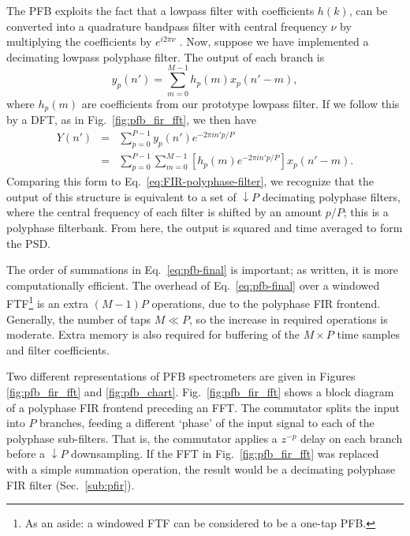 \documentclass{ws-rv961x669}
\begin{document}
The PFB exploits the fact that a lowpass filter with coefficients $h(k)$, can be converted into a quadrature bandpass filter with central frequency $\nu$ by multiplying the coefficients by $e^{i 2\pi \nu}$ . 
Now, suppose we have implemented a decimating lowpass polyphase filter. The output of each branch is 
\begin{equation}
y_{p}(n')=\sum_{m=0}^{M-1}h_{p}(m)x_{p}(n'-m),
\end{equation}
where $h_{p}(m)$ are coefficients from our prototype lowpass filter. If we follow this by a DFT, as in Fig.~\ref{fig:pfb_fir_fft}, we then have 
\begin{eqnarray}
Y(n') & = & \sum_{p=0}^{P-1}y_{p}(n')e^{-2\pi in'p/P}\\
 & = & \sum_{p=0}^{P-1}\sum_{m=0}^{M-1}[h_{p}(m)e^{-2\pi in'p/P}]x_{p}(n'-m). \label{eq:pfb-final}
\end{eqnarray}
Comparing this form to Eq.~\ref{eq:FIR-polyphase-filter}, we recognize that the output of this structure is equivalent to a set of $\downarrow P$ decimating polyphase filters,
where the central frequency of each filter is shifted by an amount $p/P$; this is a polyphase filterbank. From here, the output is squared and time averaged to form the PSD. 

The order of summations in Eq.~\ref{eq:pfb-final} is important; as written, it is more computationally efficient. The overhead of Eq.~\ref{eq:pfb-final} over a windowed FTF\footnote{As an aside: a windowed FTF can be considered to be a one-tap PFB.} is an extra $(M-1)P$ operations, due to the polyphase FIR frontend. Generally, the number of taps $M\ll P$, so the increase in required operations is moderate. Extra memory is also required for buffering of the $M\times P$ time samples and filter coefficients.  

Two different representations of PFB spectrometers are given in Figures \ref{fig:pfb_fir_fft} and \ref{fig:pfb_chart}. Fig.~\ref{fig:pfb_fir_fft} shows a block diagram of a polyphase FIR frontend preceding an FFT. The commutator splits the input into $P$ branches, feeding a different `phase' of the input signal to each of the polyphase sub-filters. That is, the commutator applies a  $z^{-p}$ delay on each branch before a $\downarrow P$ downsampling. If the FFT in Fig.~\ref{fig:pfb_fir_fft} was replaced with a simple summation operation, the result would be a decimating polyphase FIR filter (Sec.~\ref{sub:pfir}). 
\end{document}
